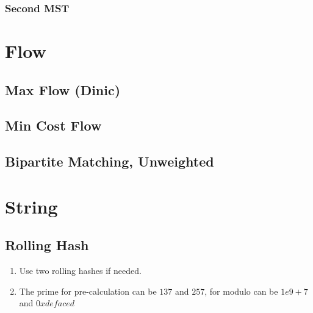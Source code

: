 \documentclass[10pt,oneside]{article}
\begin{document}
\begin{landscape}
\begin{multicols}{2}
				\subsubsection{Second MST}
				
				
				\section{Flow}
				
				\subsection{Max Flow (Dinic)}
				
				\subsection{Min Cost Flow}
				
				\subsection{Bipartite Matching, Unweighted}
				
				
				\section{String}
				
				\subsection{Rolling Hash}
				
				{\normalsize 
					\begin{enumerate}
						\item Use two rolling hashes if needed.  
						\item The prime for pre-calculation can be $137$ and $257$, for modulo can be $1e9 + 7$ and $0xdefaced$ 
					\end{enumerate}
				}
				

\end{multicols}
\end{landscape}
\end{document}
